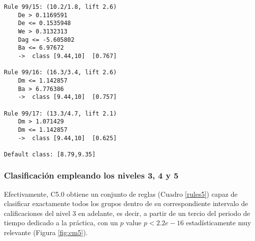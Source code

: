 \begin{tcolorbox}[title=Reglas de clasificación para identificar intervalos de notas.]
\begin{multicols}{3}
\begin{verbatim}
Rule 99/15: (10.2/1.8, lift 2.6)
	De > 0.1169591
	De <= 0.1535948
	We > 0.3132313
	Dag <= -5.605802
	Ba <= 6.97672
	->  class [9.44,10]  [0.767]

Rule 99/16: (16.3/3.4, lift 2.6)
	Dm <= 1.142857
	Ba > 6.776386
	->  class [9.44,10]  [0.757]

Rule 99/17: (13.3/4.7, lift 2.1)
	Dm > 1.071429
	Dm <= 1.142857
	->  class [9.44,10]  [0.625]

Default class: [8.79,9.35]
    \end{verbatim}
  \end{multicols}
\end{tcolorbox}

\subsubsection{Clasificación empleando los niveles 3, 4 y 5}

Efectivamente, C5.0 obtiene un conjunto de reglas (Cuadro \ref{rules5}) capaz de clasificar exactamente todos los grupos dentro de su correspondiente intervalo de calificaciones del nivel $3$ en adelante, es decir, a partir de un tercio del periodo de tiempo dedicado a la práctica, con un $p$ value $p < 2.2e-16$ estadísticamente muy relevante (Figura \ref{fig:cm5}).


